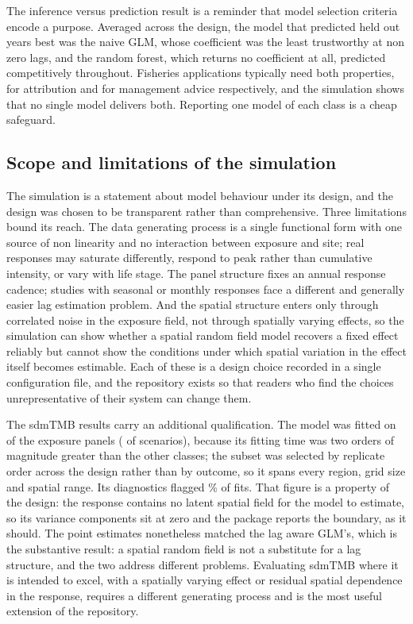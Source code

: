 The inference versus prediction result is a reminder that model selection criteria encode a purpose. Averaged across the design, the model that predicted held out years best was the naive GLM, whose coefficient was the least trustworthy at non zero lags, and the random forest, which returns no coefficient at all, predicted competitively throughout. Fisheries applications typically need both properties, for attribution and for management advice respectively, and the simulation shows that no single model delivers both. Reporting one model of each class is a cheap safeguard.

\subsection{Scope and limitations of the simulation}

The simulation is a statement about model behaviour under its design, and the design was chosen to be transparent rather than comprehensive. Three limitations bound its reach. The data generating process is a single functional form with one source of non linearity and no interaction between exposure and site; real responses may saturate differently, respond to peak rather than cumulative intensity, or vary with life stage. The panel structure fixes an annual response cadence; studies with seasonal or monthly responses face a different and generally easier lag estimation problem. And the spatial structure enters only through correlated noise in the exposure field, not through spatially varying effects, so the simulation can show whether a spatial random field model recovers a fixed effect reliably but cannot show the conditions under which spatial variation in the effect itself becomes estimable. Each of these is a design choice recorded in a single configuration file, and the repository exists so that readers who find the choices unrepresentative of their system can change them.

The sdmTMB results carry an additional qualification. The model was fitted on \sdmtmbPanelsN{} of the \nPanels{} exposure panels (\sdmtmbScenarioFrac{} of scenarios), because its fitting time was two orders of magnitude greater than the other classes; the subset was selected by replicate order across the design rather than by outcome, so it spans every region, grid size and spatial range. Its diagnostics flagged \sdmtmbNonConvPct{}\% of fits. That figure is a property of the design: the response contains no latent spatial field for the model to estimate, so its variance components sit at zero and the package reports the boundary, as it should. The point estimates nonetheless matched the lag aware GLM's, which is the substantive result: a spatial random field is not a substitute for a lag structure, and the two address different problems. Evaluating sdmTMB where it is intended to excel, with a spatially varying effect or residual spatial dependence in the response, requires a different generating process and is the most useful extension of the repository.

